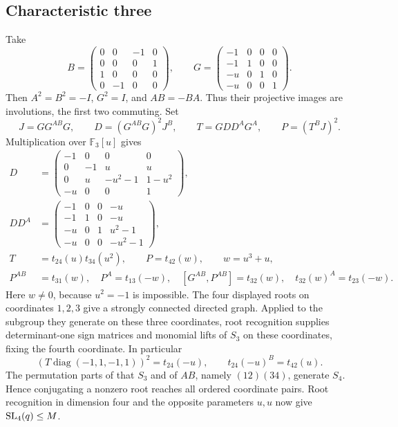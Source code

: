 \documentclass[11pt]{article}
\newcommand{\diag}{\operatorname{diag}}\newcommand{\F}{\mathbb F}
\begin{document}
\subsection{Characteristic three}
Take
\[
 B=\begin{pmatrix}0&0&-1&0\\0&0&0&1\\1&0&0&0\\0&-1&0&0\end{pmatrix},
 \qquad
 G=\begin{pmatrix}-1&0&0&0\\-1&1&0&0\\-u&0&1&0\\-u&0&0&1\end{pmatrix}.
\]
Then $A^2=B^2=-I$, $G^2=I$, and $AB=-BA$. Thus their projective images
are involutions, the first two commuting. Set
\[
 J=GG^{AB}G,\qquad D=(G^{AB}G)^2J^B,\qquad
 T=GDD^AG^A,\qquad P=(T^BJ)^2.
\]
Multiplication over $\F_3[u]$ gives
\begin{align*}
 D&=\begin{pmatrix}-1&0&0&0\\0&-1&u&u\\0&u&-u^2-1&1-u^2\\-u&0&0&1\end{pmatrix},\\
 DD^A&=\begin{pmatrix}-1&0&0&-u\\-1&1&0&-u\\-u&0&1&u^2-1\\-u&0&0&-u^2-1\end{pmatrix},\\
 T&=t_{24}(u)t_{34}(u^2),\qquad P=t_{42}(w),\qquad w=u^3+u,\\
 P^{AB}&=t_{31}(w),\quad P^A=t_{13}(-w),\quad
 [G^{AB},P^{AB}]=t_{32}(w),\quad t_{32}(w)^A=t_{23}(-w).
\end{align*}
Here $w\ne0$, because $u^2=-1$ is impossible. The four displayed roots
on coordinates $1,2,3$ give a strongly connected directed graph. Applied
to the subgroup they generate on these three coordinates, root recognition
supplies determinant-one sign matrices and monomial lifts of $S_3$ on
these coordinates, fixing the fourth coordinate. In particular
\[
 (T\diag(-1,1,-1,1))^2=t_{24}(-u),\qquad
 t_{24}(-u)^B=t_{42}(u).
\]
The permutation parts of that $S_3$ and of $AB$, namely $(12)(34)$,
generate $S_4$. Hence conjugating a nonzero root reaches all ordered
coordinate pairs. Root recognition in dimension four and the opposite
parameters $u,u$ now give $\operatorname{SL}_4(q)\leq M$.
\end{document}
